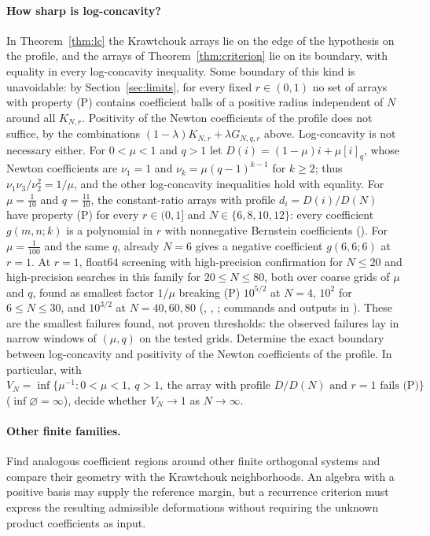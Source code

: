 \documentclass[twoside,10pt]{article}
\numberwithin{equation}{section}
\theoremstyle{slbody}
\theoremstyle{definition}
\theoremstyle{remark}
\begin{document}
\paragraph{How sharp is log-concavity?} In Theorem~\ref{thm:lc} the Krawtchouk arrays lie on the edge of the hypothesis on the profile, and the arrays of Theorem~\ref{thm:criterion} lie on its boundary, with equality in every log-concavity inequality. Some boundary of this kind is unavoidable: by Section~\ref{sec:limits}, for every fixed $r\in(0,1)$ no set of arrays with property (P) contains coefficient balls of a positive radius independent of $N$ around all $K_{N,r}$. Positivity of the Newton coefficients of the profile does not suffice, by the combinations $(1-\lambda)K_{N,r}+\lambda G_{N,q,r}$ above. Log-concavity is not necessary either. For $0<\mu<1$ and $q>1$ let $D(i)=(1-\mu)i+\mu[i]_q$, whose Newton coefficients are $\nu_1=1$ and $\nu_k=\mu(q-1)^{k-1}$ for $k\geq2$; thus $\nu_1\nu_3/\nu_2^2=1/\mu$, and the other log-concavity inequalities hold with equality. For $\mu=\frac1{10}$ and $q=\frac{11}{10}$, the constant-ratio arrays with profile $d_i=D(i)/D(N)$ have property (P) for every $r\in(0,1]$ and $N\in\{6,8,10,12\}$: every coefficient $g(m,n;k)$ is a polynomial in $r$ with nonnegative Bernstein coefficients (). For $\mu=\frac1{100}$ and the same $q$, already $N=6$ gives a negative coefficient $g(6,6;6)$ at $r=1$. At $r=1$, float64 screening with high-precision confirmation for $N\leq20$ and high-precision searches in this family for $20\leq N\leq80$, both over coarse grids of $\mu$ and $q$, found as smallest factor $1/\mu$ breaking (P) $10^{5/2}$ at $N=4$, $10^2$ for $6\leq N\leq30$, and $10^{3/2}$ at $N=40,60,80$ (, , ; commands and outputs in ). These are the smallest failures found, not proven thresholds: the observed failures lay in narrow windows of $(\mu,q)$ on the tested grids. Determine the exact boundary between log-concavity and positivity of the Newton coefficients of the profile. In particular, with $V_N=\inf\{\mu^{-1}:0<\mu<1,\ q>1,\ \text{the array with profile }D/D(N)\text{ and }r=1\text{ fails (P)}\}$ ($\inf\varnothing=\infty$), decide whether $V_N\to1$ as $N\to\infty$.

\paragraph{Other finite families.}
Find analogous coefficient regions around other finite orthogonal systems and compare their geometry with the Krawtchouk neighborhoods. An algebra with a positive basis may supply the reference margin, but a recurrence criterion must express the resulting admissible deformations without requiring the unknown product coefficients as input.
\end{document}
